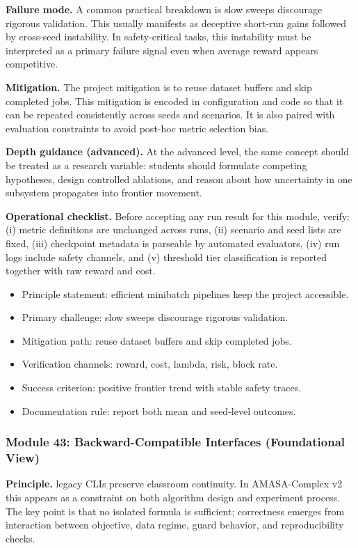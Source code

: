 \documentclass[conference]{IEEEtran}
\begin{document}
\textbf{Failure mode.} A common practical breakdown is slow sweeps discourage rigorous validation. This usually manifests as deceptive short-run gains followed by cross-seed instability. In safety-critical tasks, this instability must be interpreted as a primary failure signal even when average reward appears competitive.

\textbf{Mitigation.} The project mitigation is to reuse dataset buffers and skip completed jobs. This mitigation is encoded in configuration and code so that it can be repeated consistently across seeds and scenarios. It is also paired with evaluation constraints to avoid post-hoc metric selection bias.

\textbf{Depth guidance (advanced).} At the advanced level, the same concept should be treated as a research variable: students should formulate competing hypotheses, design controlled ablations, and reason about how uncertainty in one subsystem propagates into frontier movement.

\textbf{Operational checklist.} Before accepting any run result for this module, verify: (i) metric definitions are unchanged across runs, (ii) scenario and seed lists are fixed, (iii) checkpoint metadata is parseable by automated evaluators, (iv) run logs include safety channels, and (v) threshold tier classification is reported together with raw reward and cost.

\begin{itemize}[leftmargin=*]
  \item Principle statement: efficient minibatch pipelines keep the project accessible.
  \item Primary challenge: slow sweeps discourage rigorous validation.
  \item Mitigation path: reuse dataset buffers and skip completed jobs.
  \item Verification channels: reward, cost, lambda, risk, block rate.
  \item Success criterion: positive frontier trend with stable safety traces.
  \item Documentation rule: report both mean and seed-level outcomes.
\end{itemize}


\subsubsection{Module 43: Backward-Compatible Interfaces (Foundational View)}
\textbf{Principle.} legacy CLIs preserve classroom continuity. In AMASA-Complex v2 this appears as a constraint on both algorithm design and experiment process. The key point is that no isolated formula is sufficient; correctness emerges from interaction between objective, data regime, guard behavior, and reproducibility checks.
\end{document}
